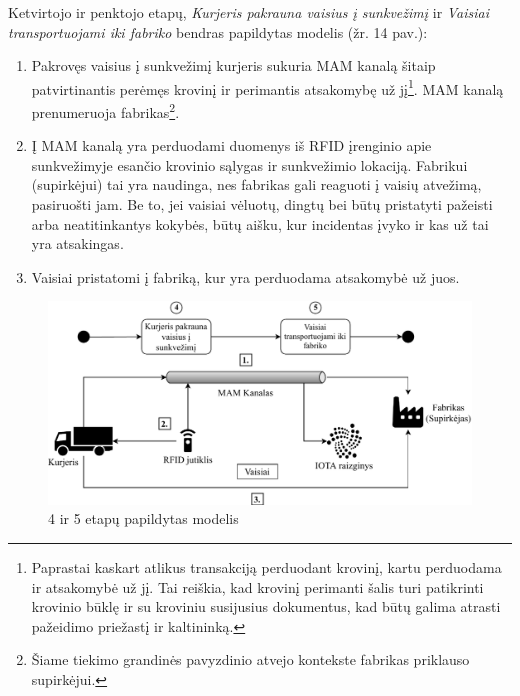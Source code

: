 Ketvirtojo ir penktojo etapų, \textit{Kurjeris pakrauna vaisius į sunkvežimį} ir \textit{Vaisiai transportuojami iki fabriko} bendras papildytas modelis (žr. 14 pav.):
\begin{enumerate}
    \item Pakrovęs vaisius į sunkvežimį kurjeris sukuria MAM kanalą šitaip patvirtinantis perėmęs krovinį ir perimantis atsakomybę už jį\footnote{Paprastai kaskart atlikus transakciją perduodant krovinį, kartu perduodama ir atsakomybė už jį. Tai reiškia, kad krovinį perimanti šalis turi patikrinti krovinio būklę ir su kroviniu susijusius dokumentus, kad būtų galima atrasti pažeidimo priežastį ir kaltininką.}. MAM kanalą prenumeruoja fabrikas\footnote{Šiame tiekimo grandinės pavyzdinio atvejo kontekste fabrikas priklauso supirkėjui.}.
    \item Į MAM kanalą yra perduodami duomenys iš RFID įrenginio apie sunkvežimyje esančio krovinio sąlygas ir sunkvežimio lokaciją. Fabrikui (supirkėjui) tai yra naudinga, nes fabrikas gali reaguoti į vaisių atvežimą, pasiruošti jam. Be to, jei vaisiai vėluotų, dingtų bei būtų pristatyti pažeisti arba neatitinkantys kokybės, būtų aišku, kur incidentas įvyko ir kas už tai yra atsakingas.
    \item Vaisiai pristatomi į fabriką, kur yra perduodama atsakomybė už juos.
\end{enumerate}

\begin{figure}[H]
    \centering
    \includegraphics[scale=0.7]{images/iota-usecase-4-5}
    \caption{4 ir 5 etapų papildytas modelis}
\end{figure}





